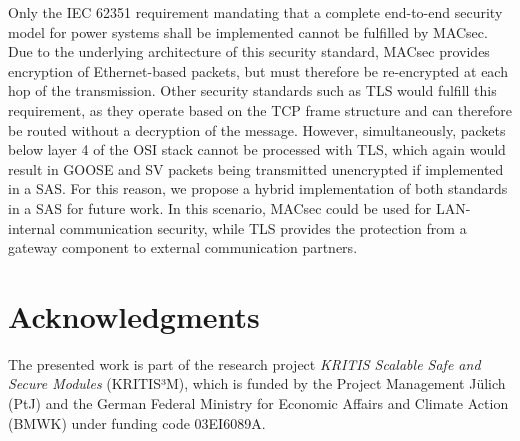 \documentclass[conference, onecolumn, a4paper]{IEEEtran}
\begin{document}
\smallskip
Only the IEC 62351 requirement mandating that a complete end-to-end security model for power systems shall be implemented \cite{Review_IEC62351:2019} cannot 
be fulfilled by MACsec. Due to the underlying architecture of this security standard, MACsec provides encryption of Ethernet-based packets, but must therefore 
be re-encrypted at each hop of the transmission. Other security standards such as TLS would fulfill this requirement, as they operate based on the TCP 
frame structure and can therefore be routed without a decryption of the message. However, simultaneously, packets below layer 4 of the OSI stack cannot 
be processed with TLS, which again would result in GOOSE and SV packets being transmitted unencrypted if implemented in a SAS. For this reason, we propose 
a hybrid implementation of both standards in a SAS for future work. In this scenario, MACsec could be used for LAN-internal communication security, while 
TLS provides the protection from a gateway component to external communication partners.    

\section{Acknowledgments}
The presented work is part of the research project \emph{KRITIS Scalable Safe and Secure Modules} (KRITIS³M), which is funded by the Project Management 
Jülich (PtJ) and the German Federal Ministry for Economic Affairs and Climate Action (BMWK) under funding code 03EI6089A.
\printbibliography
\end{document}
